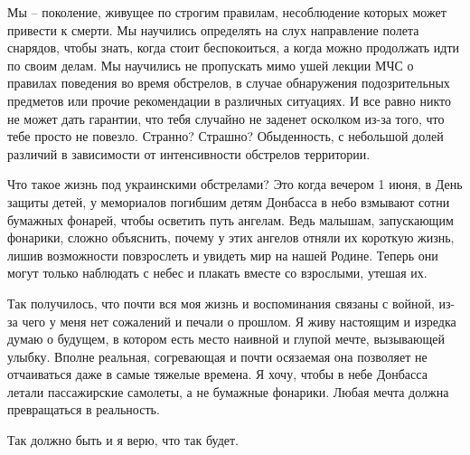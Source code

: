 Мы – поколение, живущее по строгим правилам, несоблюдение которых может
привести к смерти. Мы научились определять на слух направление полета снарядов,
чтобы знать, когда стоит беспокоиться, а когда можно продолжать идти по своим
делам. Мы научились не пропускать мимо ушей лекции МЧС о правилах поведения во
время обстрелов, в случае обнаружения подозрительных предметов или прочие
рекомендации в различных ситуациях. И все равно никто не может дать гарантии,
что тебя случайно не заденет осколком из-за того, что тебе просто не повезло.
Странно? Страшно? Обыденность, с небольшой долей различий в зависимости от
интенсивности обстрелов территории.

Что такое жизнь под украинскими обстрелами? Это когда вечером 1 июня, в День
защиты детей, у мемориалов погибшим детям Донбасса в небо взмывают сотни
бумажных фонарей, чтобы осветить путь ангелам. Ведь малышам, запускающим
фонарики, сложно объяснить, почему у этих ангелов отняли их короткую жизнь,
лишив возможности повзрослеть и увидеть мир на нашей Родине. Теперь они могут
только наблюдать с небес и плакать вместе со взрослыми, утешая их.

Так получилось, что почти вся моя жизнь и воспоминания связаны с войной, из-за
чего у меня нет сожалений и печали о прошлом. Я живу настоящим и изредка думаю
о будущем, в котором есть место наивной и глупой мечте, вызывающей улыбку.
Вполне реальная, согревающая и почти осязаемая она позволяет не отчаиваться
даже в самые тяжелые времена. Я хочу, чтобы в небе Донбасса летали пассажирские
самолеты, а не бумажные фонарики. Любая мечта должна превращаться в реальность.

Так должно быть и я верю, что так будет.

